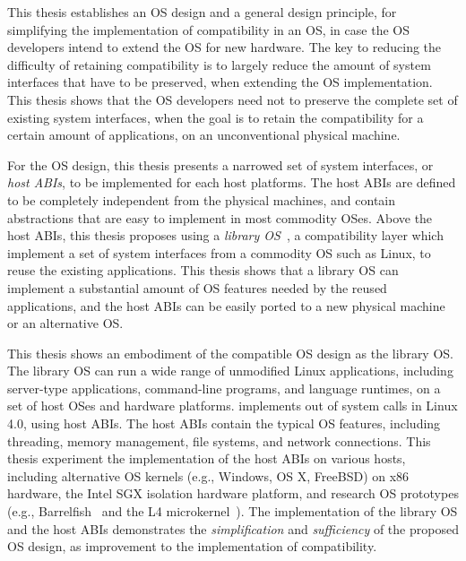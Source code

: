 This thesis establishes an OS design and a general design principle, for simplifying the implementation of compatibility in an OS, in case the OS developers intend to extend the OS for new hardware.
The key to reducing the difficulty of retaining compatibility
is to largely reduce the amount of system interfaces that have to be preserved,
when extending the OS implementation.
This thesis shows that the OS developers need not to preserve the complete set of existing system interfaces, when the goal is to retain the compatibility for a certain amount of applications, on an unconventional physical machine.



For the OS design, this thesis presents a narrowed set of system interfaces,
or {\em host ABIs},
to be implemented for each host platforms.
The host ABIs are defined to be completely independent from the physical machines,
and contain abstractions that are easy to implement in most commodity OSes.
Above the host ABIs, this thesis proposes using a {\em library OS}~\cite{porter11drawbridge,engler95exokernel,libra,unikernels},
a compatibility layer which implement a set of system interfaces from a commodity OS such as Linux, to reuse the existing applications.
This thesis shows that a library OS can implement a substantial amount of OS features needed by the reused applications,
and the host ABIs can be easily ported to a new physical machine or an alternative OS.


This thesis shows an embodiment of the compatible OS design as the \graphene{} library OS.
The \graphene{} library OS can run a wide range of unmodified Linux applications,
including server-type applications, command-line programs, and language runtimes, on a set of host OSes and hardware platforms.
\graphene{} implements  \graphenesyscalls{} out of \linuxsyscalls{} system calls in Linux 4.0,
using \palcalls{} host ABIs. 
The host ABIs contain the typical OS features, including threading, memory management, file systems, and network connections.
This thesis experiment the implementation of the host ABIs on various hosts,
including alternative OS kernels (e.g., Windows, OS X, FreeBSD) on x86 hardware,
the Intel SGX isolation hardware platform,
and research OS prototypes (e.g., Barrelfish~\cite{baumann09barrelfish} and the L4 microkernel~\cite{l4family}).
The implementation of the \graphene{} library OS and the host ABIs demonstrates the {\em simplification} and {\em sufficiency} of the proposed OS design, as improvement to the implementation of compatibility.



